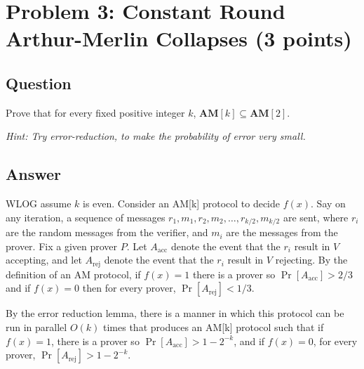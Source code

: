 \documentclass{article}
\newcommand{\BPP}{\mathbf{BPP}}
\newcommand{\AM}{\mathbf{AM}}
\begin{document}


\newpage
\section*{Problem 3: Constant Round Arthur-Merlin Collapses (3 points)}

\subsection*{Question}
Prove that for every fixed positive integer $k$, $\AM[k]\subseteq \AM[2]$.

\medskip

\emph{Hint: Try error-reduction, to make the probability of error very small.}


\subsection*{Answer}

WLOG assume $k$ is even. Consider an AM[k] protocol to decide $f(x)$.  Say on any iteration, a sequence of messages $r_1, m_1, r_2, m_2, \dots, r_{k/2}, m_{k/2}$ are sent, where $r_i$ are the random messages from the verifier, and $m_i$ are the messages from the prover.
Fix a given prover $P$.  Let $A_\text{acc}$ denote the event that the $r_i$ result in $V$ accepting, and let $A_\text{rej}$ denote the event that the $r_i$ result in $V$ rejecting.
By the definition of an AM protocol, if $f(x) = 1$ there is a prover so $\Pr[A_\text{acc}] > 2/3$ and if $f(x) = 0$ then for every prover, $\Pr[A_\text{rej}] < 1/3$.

By the error reduction lemma, there is a manner in which this protocol can be run in parallel $O(k)$ times that produces an AM[k] protocol such that if $f(x) = 1$, there is a prover so $\Pr[A_\text{acc}] > 1 - 2^{-k}$, and if $f(x) = 0$, for every prover, $\Pr[A_\text{rej}] > 1 - 2^{-k}$.

\end{document}
